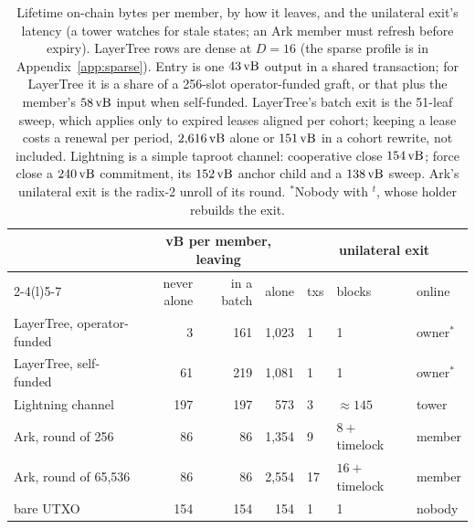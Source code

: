
\begin{table}[tbp]
\centering
\caption{Lifetime on-chain bytes per member, by how it leaves, and the unilateral exit's latency (a tower watches for stale states; an Ark member must refresh before expiry). LayerTree rows are dense at $D = 16$ (the sparse profile is in Appendix~\ref{app:sparse}). Entry is one $43\,\mathrm{vB}$ output in a shared transaction; for LayerTree it is a share of a 256-slot operator-funded graft, or that plus the member's $58\,\mathrm{vB}$ input when self-funded. LayerTree's batch exit is the 51-leaf sweep, which applies only to expired leases aligned per cohort; keeping a lease costs a renewal per period, $2{,}616\,\mathrm{vB}$ alone or $151\,\mathrm{vB}$ in a cohort rewrite, not included. Lightning is a simple taproot channel: cooperative close $154\,\mathrm{vB}$; force close a $240\,\mathrm{vB}$ commitment, its $152\,\mathrm{vB}$ anchor child and a $138\,\mathrm{vB}$ sweep. Ark's unilateral exit is the radix-2 unroll of its round. $^{*}$Nobody with $^{t}$, whose holder rebuilds the exit.}
\label{tab:lifetime}
\setlength{\tabcolsep}{3pt}\scriptsize
\begin{tabular}{@{}lrrrlll@{}}
\toprule
 & \multicolumn{3}{c}{vB per member, leaving} & \multicolumn{3}{c}{unilateral exit} \\
\cmidrule(lr){2-4}\cmidrule(l){5-7}
 & never alone & in a batch & alone & txs & blocks & online \\
\midrule
LayerTree, operator-funded & 3 & 161 & 1{,}023 & 1 & 1 & owner$^{*}$ \\
LayerTree, self-funded & 61 & 219 & 1{,}081 & 1 & 1 & owner$^{*}$ \\
Lightning channel & 197 & 197 & 573 & 3 & $\approx 145$ & tower \\
Ark, round of 256 & 86 & 86 & 1{,}354 & 9 & $8 +$ timelock & member \\
Ark, round of 65{,}536 & 86 & 86 & 2{,}554 & 17 & $16 +$ timelock & member \\
bare UTXO & 154 & 154 & 154 & 1 & 1 & nobody \\
\bottomrule
\end{tabular}
\end{table}
